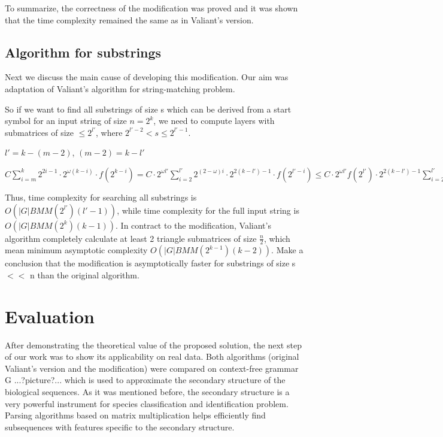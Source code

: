 \documentclass[runningheads]{llncs}
\begin{document}
To summarize, the correctness of the modification was proved and it was shown that the time complexity remained the same as in Valiant's version.

\subsection{Algorithm for substrings}

Next we discuss the main cause of developing this modification. Our aim was adaptation of Valiant's algorithm for string-matching problem. 

So if we want to find all substrings of size s which can be derived from a start symbol for an input string of size $n = 2^k$, we need to compute layers with submatrices of size $\le 2^{l'}$, where $ 2^{l' - 2} < s \le 2^{l' - 1}$.

$l' = k - (m - 2)$, $(m - 2) = k - l'$

$ C \sum\limits_{i=m}^k 2^{2i - 1} \cdot 2^{\omega(k - i)} \cdot f(2^{k - i}) = C \cdot 2^{\omega l'}\sum\limits_{i=2}^{l'} 2^{(2 - \omega)i} \cdot 2^{2(k - l') - 1} \cdot f(2^{l' - i}) \le C \cdot 2^{\omega l'} f(2^{l'}) \cdot 2^{2(k - l') - 1} \sum\limits_{i=2}^{l'} 2^{(2 - \omega)i} = BMM(2^{l'}) \cdot 2^{2(k - l') - 1} \sum\limits_{i=2}^{l'} 2^{(2 - \omega)i}$ 

Thus, time complexity for searching all substrings is  $O(|G|BMM(2^{l'})(l' - 1))$, while time complexity for the full input string is $O(|G|BMM(2^k)(k - 1))$. In contract to the modification, Valiant's algorithm completely calculate at least 2 triangle submatrices of size $\frac{n}{2}$, which mean minimum asymptotic complexity  $O(|G|BMM(2^{k - 1})(k - 2))$. Make a conclusion that the modification is asymptotically faster for substrings of size s $<<$ n  than the original algorithm. 

\section{Evaluation}

After demonstrating the theoretical value of the proposed solution, the next step of our work was to show its applicability on real data. Both algorithms (original Valiant's version and the modification) were compared on context-free grammar G  ...?picture?...  which is used to approximate the secondary structure of the biological sequences. As it was mentioned before, the secondary structure is a very powerful instrument for species classification and identification problem. Parsing algorithms based on matrix multiplication helps efficiently find subsequences with features specific to the secondary structure.
\end{document}
